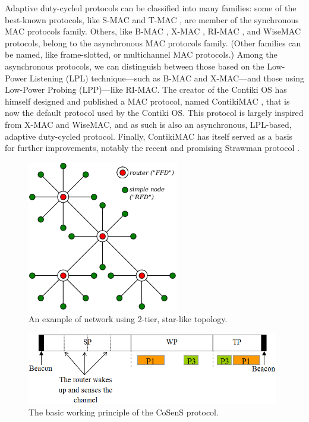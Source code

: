 \documentclass[12pt,twoside,a4paper]{article}
\begin{document}
Adaptive duty-cycled protocols can be classified into many families:
some of the best-known protocols, like S-MAC \cite{s-mac} and
T-MAC \cite{t-mac}, are member of the synchronous MAC protocols family.
Others, like B-MAC \cite{b-mac}, X-MAC \cite{x-mac}, RI-MAC \cite{ri-mac},
and WiseMAC \cite{wise-mac} protocols, belong to the asynchronous MAC
protocols family. (Other families can be named, like frame-slotted,
or multichannel MAC protocols.) Among the asynchronous protocols,
we can distinguish between those based on the Low-Power Listening (LPL)
technique---such as B-MAC and X-MAC---and those using Low-Power
Probing (LPP)---like RI-MAC. The creator of the Contiki OS has himself
designed and published a MAC protocol, named ContikiMAC \cite{contiki-mac},
that is now the default protocol used by the Contiki OS. This protocol
is largely inspired from X-MAC and WiseMAC, and as such is also
an asynchronous, LPL-based, adaptive duty-cycled protocol.
Finally, ContikiMAC has itself served as a basis for further
improvements, notably the recent and promising
Strawman protocol \cite{strawman-mac}.

\begin{figure}[!t]
\centering
\includegraphics{star-topo-net.png}
\caption{An example of network using 2-tier, star-like topology.}
\label{star-topo-net}
\end{figure}
\hfil
\begin{figure}[!t]
\centering
\includegraphics[width=11cm]{superframe.png}
\caption{The basic working principle of the CoSenS protocol.}
\label{cosens-principle}
\end{figure}
\end{document}

